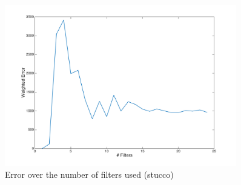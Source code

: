 \documentclass[11pt, oneside]{article}   	%
\begin{document}
\begin{figure}[H]
	\centering
	\includegraphics[width=0.9\textwidth]{stucco}
	\caption{Error over the number of filters used (stucco)}
	\label {fig:stucco}
\end{figure}
\end{document}
